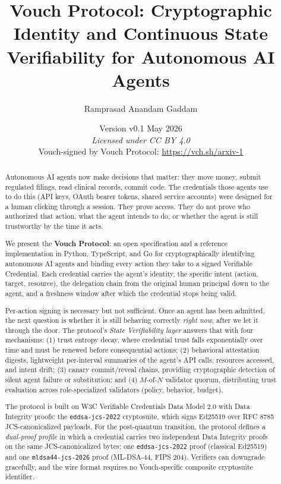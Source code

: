 \documentclass[11pt,a4paper,twocolumn]{article}
\title{
    Vouch Protocol: Cryptographic Identity and Continuous State Verifiability for Autonomous AI Agents
}
\author[1]{Ramprasad Anandam Gaddam}
\affil[1]{Independent (open-source maintainer, Vouch Protocol). \\
\texttt{ram@vouch-protocol.com} \\
\url{https://github.com/vouch-protocol/vouch}}
\date{Version v0.1 \quad May 2026 \\
\emph{Licensed under CC BY 4.0} \\[4pt]
\small Vouch-signed by Vouch Protocol: \url{https://vch.sh/arxiv-1}}
\begin{document}
\maketitle

\begin{abstract}
Autonomous AI agents now make decisions that matter: they move money, submit regulated filings, read clinical records, commit code. The credentials those agents use to do this (API keys, OAuth bearer tokens, shared service accounts) were designed for a human clicking through a session. They prove access. They do not prove who authorized that action, what the agent intends to do, or whether the agent is still trustworthy by the time it acts.

We present the \textbf{Vouch Protocol}: an open specification and a reference implementation in Python, TypeScript, and Go for cryptographically identifying autonomous AI agents and binding every action they take to a signed Verifiable Credential. Each credential carries the agent's identity, the specific intent (action, target, resource), the delegation chain from the original human principal down to the agent, and a freshness window after which the credential stops being valid.

Per-action signing is necessary but not sufficient. Once an agent has been admitted, the next question is whether it is still behaving correctly \emph{right now}, after we let it through the door. The protocol's \emph{State Verifiability layer} answers that with four mechanisms: (1) trust entropy decay, where credential trust falls exponentially over time and must be renewed before consequential actions; (2) behavioral attestation digests, lightweight per-interval summaries of the agent's API calls, resources accessed, and intent drift; (3) canary commit/reveal chains, providing cryptographic detection of silent agent failure or substitution; and (4) $M$-of-$N$ validator quorum, distributing trust evaluation across role-specialized validators (policy, behavior, budget).

The protocol is built on W3C Verifiable Credentials Data Model 2.0 with Data Integrity proofs: the \texttt{eddsa-jcs-2022} cryptosuite, which signs Ed25519 over RFC 8785 JCS-canonicalized payloads. For the post-quantum transition, the protocol defines a \emph{dual-proof profile} in which a credential carries two independent Data Integrity proofs on the same JCS-canonicalized bytes: one \texttt{eddsa-jcs-2022} proof (classical Ed25519) and one \texttt{mldsa44-jcs-2026} proof (ML-DSA-44, FIPS 204). Verifiers can downgrade gracefully, and the wire format requires no Vouch-specific composite cryptosuite identifier.


\end{abstract}
\end{document}
